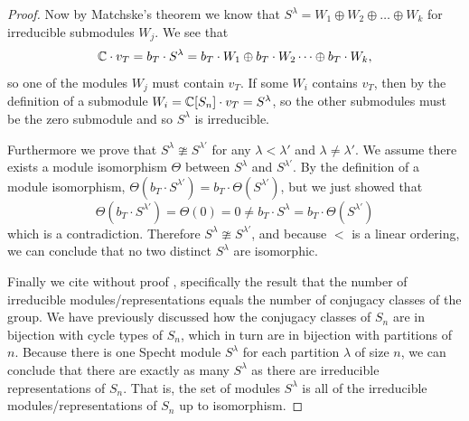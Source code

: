 \documentclass[12pt,twoside]{reedthesis}
\theoremstyle{plain}   %
\theoremstyle{definition}
\theoremstyle{remark}
\numberwithin{equation}{section}
\begin{document}
\begin{proof}
    Now by Matchske's theorem we know that $S^\lambda = W_1 \oplus W_2 \oplus \dots \oplus W_k$ for irreducible submodules $W_j$.
    We see that
    \[\mathbb{C} \cdot v_T = b_T \cdot S^\lambda = b_T \cdot W_1 \oplus b_T \cdot W_2 \dots \oplus b_T \cdot W_k,\]
    so one of the modules $W_j$ must contain $v_T$.
    If some $W_i$ contains $v_T$, then by the definition of a submodule $W_i = \mathbb{C} [S_n] \cdot v_T = S^\lambda$, so
    the other submodules must be the zero submodule and so $S^\lambda$ is irreducible.
    \par
    Furthermore we prove that $S^\lambda  \ncong S^{\lambda'}$ for any $\lambda < \lambda'$ and $\lambda \neq \lambda'$.
    We assume there exists a module isomorphism $\Theta$ between $S^\lambda$ and $S^{\lambda'}$.
    By the definition of a module isomorphism, $\Theta(b_T \cdot S^{\lambda'}) = b_T \cdot \Theta( S^{\lambda'})$,
    but we just showed that
    \[\Theta(b_T \cdot S^{\lambda'}) = \Theta(0) = 0 \neq b_T \cdot S^\lambda = b_T \cdot \Theta( S^{\lambda'})\]
    which is a contradiction. Therefore $S^\lambda \ncong S^{\lambda'}$, and because $<$ is a linear ordering, we can conclude that
    no two distinct $S^\lambda$ are isomorphic. \par
    Finally we cite without proof \cite[Proposition 1.10.1]{sagan}, specifically the result that the number of irreducible modules/representations equals
    the number of conjugacy classes of the group. We have previously discussed how the conjugacy classes of $S_n$ are in bijection with cycle types of $S_n$,
    which in turn are in bijection with partitions of $n$.
    Because there is one Specht module $S^\lambda$ for each partition $\lambda$ of size $n$,
    we can conclude that there are exactly as many $S^\lambda$ as there are irreducible representations of $S_n$.
    That is, the set of modules $S^\lambda$ is all of the irreducible modules/representations of $S_n$ up to isomorphism.
  \end{proof}
\end{document}
